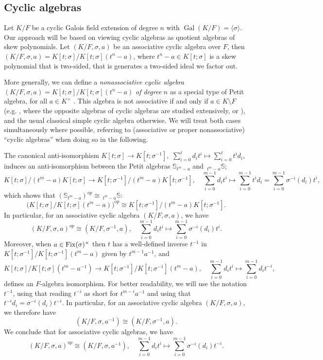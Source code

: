 \documentclass{amsart}
\theoremstyle{plain}
\theoremstyle{definition}
\numberwithin{equation}{section}
\numberwithin{figure}{section}
\DeclareMathOperator{\Gal}{Gal}
\begin{document}
\subsection{Cyclic algebras}


Let $K/F$ be a cyclic Galois field extension of degree $n$ with $\Gal (K/F)=\langle \sigma \rangle$. Our approach will be based on viewing cyclic algebras as quotient algebras of skew polynomials.  Let $(K/F,\sigma,a)$ be an associative cyclic algebra over $F$, then
$(K/F,\sigma,a)=K[t;\sigma]/K[t;\sigma](t^n-a)$, where $t^n-a\in K[t;\sigma]$ is a skew polynomial that is two-sided, that is generates a two-sided ideal we factor out.

More generally, we can define a \emph{nonassociative cyclic algebra}  $(K/F,\sigma,a)=K[t;\sigma]/K[t;\sigma](t^n-a)$ \emph{of degree} $n$ as a special type of  Petit algebra, for all $a\in K^\times$ \cite{P66}. This algebra is not associative if and only if $a\in K\setminus F$ (e.g. \cite{S12}, where the opposite algebras of cyclic algebras are studied extensively, or \cite{Pum2021}), and the usual classical simple cyclic algebra otherwise. We will treat both cases simultaneously where possible, referring to (associative or proper nonassociative) ``cyclic algebras'' when doing so  in the following.

The canonical anti-isomorphism $K[t;\sigma]\to K[t;\sigma^{-1}], $ $\sum_{i=0}^\ell d_it^i \mapsto \sum_{i=0}^\ell t^i d_i $, induces an anti-isomorphism between the Petit algebras $\mathbb{S}_{t^m-a}$ and $\,_{t^m-a }\mathbb{S}$;
$$K[t;\sigma]/ (t^m-a) K[t;\sigma]\to K[t;\sigma^{-1}]/ (t^m-a) K[t;\sigma^{-1}],\quad  \sum_{i=0}^{m-1} d_it^i \mapsto \sum_{i=0}^{m-1} t^i d_i = \sum_{i=0}^{m-1} \sigma^{-i}(d_i)t^i  ,$$
which shows that $(\mathbb{S}_{t^m-a})^{op}\cong \,_{t^m-a }\mathbb{S}$:
$$\big(K[t;\sigma]/ K[t;\sigma](t^m-a)\big)^{op} \cong K[t;\sigma^{-1}]/ (t^m-a) K[t;\sigma^{-1}].$$
In particular, for an associative cyclic algebra $(K/F,\sigma,a)$, we have
$$(K/F,\sigma, a)^{op}\cong (K/F,\sigma^{-1},a), \quad
\sum_{i=0}^{m-1} d_it^i \mapsto \sum_{i=0}^{m-1} \sigma^{-i}(d_i)t^i  .$$
Moreover, when $a\in {\rm Fix}(\sigma)^\times$ then 
$t$ has a well-defined inverse $t^{-1}$ in $K[t;\sigma^{-1}]/ K[t;\sigma^{-1}](t^m-a)$ given by $t^{m-1}a^{-1}$, and
$$ K[t;\sigma]/ K[t;\sigma](t^m-a^{-1}) \to  K[t;\sigma^{-1}]/ K[t;\sigma^{-1}](t^m-a)
,\quad  \sum_{i=0}^{m-1} d_it^i \mapsto \sum_{i=0}^{m-1}d_i t^{-i} ,$$
defines an $F$-algebra isomorphism. For better readability, we will use the notation $t^{-1}$, using that
reading $t^{-i}$ as short for $t^{m-i} a^{-1}$ and
using that $t^{-i}d_i=\sigma^{-i}(d_i)t^{-i}$.
In particular, for an associative cyclic algebra $(K/F,\sigma,a)$, we therefore have
$$(K/F,\sigma, a^{-1})\cong (K/F,\sigma^{-1},a).$$
We conclude that for associative cyclic algebras, we have
$$(K/F,\sigma, a)^{op}\cong (K/F,\sigma,a^{-1}),  \quad
\sum_{i=0}^{m-1} d_it^i \mapsto \sum_{i=0}^{m-1} \sigma^{-i}(d_i)t^{-i} .$$
\end{document}
